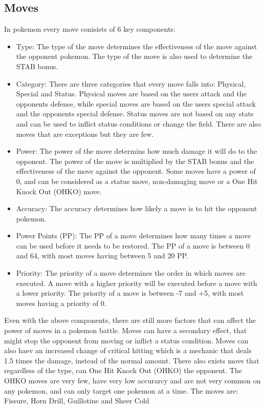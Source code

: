 \subsection{Moves}
In pokemon every move conisists of 6 key components:
\begin{itemize}
  \item Type: The type of the move determines the effectiveness of the move against the opponent pokemon. 
    The type of the move is also used to determine the STAB bonus.
  \item Category: There are three categories that every move falls into: Physical, Special and Status. 
    Physical moves are based on the users attack and the opponents defense, while special moves are based on the users 
    special attack and the opponents special defense. Status moves are not based on any 
    stats and can be used to inflict status conditions or change the field. There are also moves that are exceptions but they are few.
  \item Power: The power of the move determins how much damage it will do to the opponent. The power of the move is 
    multiplied by the STAB bonus and the effectiveness of the move against the opponent. Some moves have a power of 0,
    and can be considered as a status move, non-damaging move or a One Hit Knock Out (OHKO) move.
  \item Accuracy: The accuracy determines how likely a move is to hit the opponent pokemon.
  \item Power Points (PP): The PP of a move determines how many times a move can be used before it needs to be restored.
    The PP of a move is between 0 and 64, with most moves having between 5 and 20 PP.
  \item Priority: The priority of a move determines the order in which moves are executed. A move with a higher priority 
  will be executed before a move with a lower priority. The priority of a move is between -7 and +5, 
  with most moves having a priority of 0.
\end{itemize}
Even with the above components, there are still more factors that can affect the power of moves in a pokemon battle.
Moves can have a secondary effect, that might stop the opponent from moving or inflict a status condition. 
Moves can also haev an increased change of critical hitting which is a mechanic that deals 1.5 times the damage, instead
of the normal amount. There also exists move that regardless of the type, can One Hit Knock Out (OHKO) the opponent.
The OHKO moves are very few, have very low accurarcy and are not very common on any pokemon, and can only
target one pokemon at a time. The moves are: Fissure, Horn Drill, Guillotine and Sheer Cold

